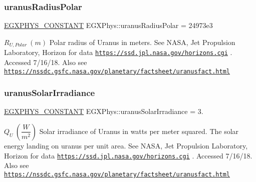 \subsubsection{\texorpdfstring{uranus\+Radius\+Polar}{uranusRadiusPolar}}
{\footnotesize\ttfamily \mbox{\hyperlink{group___e_g_x_phys-_constants-_macros_ga76980d288494ce1714c9ac68a95ba702}{E\+G\+X\+P\+H\+Y\+S\+\_\+\+C\+O\+N\+S\+T\+A\+NT}} E\+G\+X\+Phys\+::uranus\+Radius\+Polar = 24973e3}

$R_{U,Polar} \ (m)$ Polar radius of Uranus in meters. See N\+A\+SA, Jet Propulsion Laboratory, Horizon for data \href{https://ssd.jpl.nasa.gov/horizons.cgi}{\tt https\+://ssd.\+jpl.\+nasa.\+gov/horizons.\+cgi} . Accessed 7/16/18. Also see \href{https://nssdc.gsfc.nasa.gov/planetary/factsheet/uranusfact.html}{\tt https\+://nssdc.\+gsfc.\+nasa.\+gov/planetary/factsheet/uranusfact.\+html} \mbox{\label{group___e_g_x_phys-_constants-_astrophysics-_solar_system-_uranus-_bulk_gab404609141c0f15c982dd80012e9dbcd}} 
\subsubsection{\texorpdfstring{uranus\+Solar\+Irradiance}{uranusSolarIrradiance}}
{\footnotesize\ttfamily \mbox{\hyperlink{group___e_g_x_phys-_constants-_macros_ga76980d288494ce1714c9ac68a95ba702}{E\+G\+X\+P\+H\+Y\+S\+\_\+\+C\+O\+N\+S\+T\+A\+NT}} E\+G\+X\+Phys\+::uranus\+Solar\+Irradiance = 3.}

$ Q_{U} \ (\dfrac{W}{m^2})$ Solar irradiance of Uranus in watts per meter squared. The solar energy landing on uranus per unit area. See N\+A\+SA, Jet Propulsion Laboratory, Horizon for data \href{https://ssd.jpl.nasa.gov/horizons.cgi}{\tt https\+://ssd.\+jpl.\+nasa.\+gov/horizons.\+cgi} . Accessed 7/16/18. Also see \href{https://nssdc.gsfc.nasa.gov/planetary/factsheet/uranusfact.html}{\tt https\+://nssdc.\+gsfc.\+nasa.\+gov/planetary/factsheet/uranusfact.\+html} \mbox{\label{group___e_g_x_phys-_constants-_astrophysics-_solar_system-_uranus-_bulk_ga2638d351b4c8647d718febed6c4d6aa3}} 
